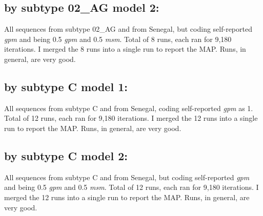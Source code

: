 \documentclass[12pt,]{article}
\begin{document}
\hypertarget{by-subtype-02_ag-model-2}{%
\subsection{by subtype 02\_AG model 2:}\label{by-subtype-02_ag-model-2}}

All sequences from subtype 02\_AG and from Senegal, but coding
self-reported \emph{gpm} and being 0.5 \emph{gpm} and 0.5 \emph{msm}.
Total of 8 runs, each ran for 9,180 iterations. I merged the 8 runs into
a single run to report the MAP. Runs, in general, are very good.

\hypertarget{by-subtype-c-model-1}{%
\subsection{by subtype C model 1:}\label{by-subtype-c-model-1}}

All sequences from subtype C and from Senegal, coding self-reported
\emph{gpm} as 1. Total of 12 runs, each ran for 9,180 iterations. I
merged the 12 runs into a single run to report the MAP. Runs, in
general, are very good.

\hypertarget{by-subtype-c-model-2}{%
\subsection{by subtype C model 2:}\label{by-subtype-c-model-2}}

All sequences from subtype C and from Senegal, but coding self-reported
\emph{gpm} and being 0.5 \emph{gpm} and 0.5 \emph{msm}. Total of 12
runs, each ran for 9,180 iterations. I merged the 12 runs into a single
run to report the MAP. Runs, in general, are very good.
\end{document}
